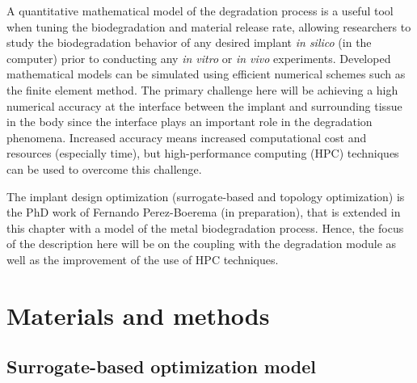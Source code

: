 A quantitative mathematical model of the degradation process is a useful tool when tuning the biodegradation and material release rate, allowing researchers to study the biodegradation behavior of any desired implant \textit{in silico} (in the computer) prior to conducting any \textit{in vitro} or \textit{in vivo} experiments. Developed mathematical models can be simulated using efficient numerical schemes such as the finite element method. The primary challenge here will be achieving a high numerical accuracy at the interface between the implant and surrounding tissue in the body since the interface plays an important role in the degradation phenomena. Increased accuracy means increased computational cost and resources (especially time), but high-performance computing (\gls{HPC}) techniques can be used to overcome this challenge.

The implant design optimization (surrogate-based and topology optimization) is the PhD work of Fernando Perez-Boerema (in preparation), that is extended in this chapter with a model of the metal biodegradation process. Hence, the focus of the description here will be on the coupling with the degradation module as well as the improvement of the use of HPC techniques.


\section{Materials and methods}

\subsection{Surrogate-based optimization model}


